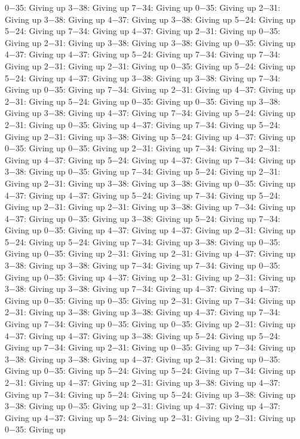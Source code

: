 0−35: Giving up
3−38: Giving up
7−34: Giving up
0−35: Giving up
2−31: Giving up
3−38: Giving up
4−37: Giving up
3−38: Giving up
5−24: Giving up
5−24: Giving up
7−34: Giving up
4−37: Giving up
2−31: Giving up
0−35: Giving up
2−31: Giving up
3−38: Giving up
3−38: Giving up
0−35: Giving up
4−37: Giving up
4−37: Giving up
5−24: Giving up
7−34: Giving up
7−34: Giving up
2−31: Giving up
2−31: Giving up
0−35: Giving up
5−24: Giving up
5−24: Giving up
4−37: Giving up
3−38: Giving up
3−38: Giving up
7−34: Giving up
0−35: Giving up
7−34: Giving up
2−31: Giving up
4−37: Giving up
2−31: Giving up
5−24: Giving up
0−35: Giving up
0−35: Giving up
3−38: Giving up
3−38: Giving up
4−37: Giving up
7−34: Giving up
5−24: Giving up
2−31: Giving up
0−35: Giving up
4−37: Giving up
7−34: Giving up
5−24: Giving up
2−31: Giving up
3−38: Giving up
5−24: Giving up
4−37: Giving up
0−35: Giving up
0−35: Giving up
2−31: Giving up
7−34: Giving up
2−31: Giving up
4−37: Giving up
5−24: Giving up
4−37: Giving up
7−34: Giving up
3−38: Giving up
0−35: Giving up
7−34: Giving up
5−24: Giving up
2−31: Giving up
2−31: Giving up
3−38: Giving up
3−38: Giving up
0−35: Giving up
4−37: Giving up
4−37: Giving up
5−24: Giving up
7−34: Giving up
5−24: Giving up
2−31: Giving up
2−31: Giving up
3−38: Giving up
7−34: Giving up
4−37: Giving up
0−35: Giving up
3−38: Giving up
5−24: Giving up
7−34: Giving up
0−35: Giving up
4−37: Giving up
4−37: Giving up
2−31: Giving up
5−24: Giving up
5−24: Giving up
7−34: Giving up
3−38: Giving up
0−35: Giving up
0−35: Giving up
2−31: Giving up
2−31: Giving up
4−37: Giving up
3−38: Giving up
3−38: Giving up
7−34: Giving up
7−34: Giving up
0−35: Giving up
0−35: Giving up
4−37: Giving up
2−31: Giving up
2−31: Giving up
3−38: Giving up
3−38: Giving up
7−34: Giving up
4−37: Giving up
4−37: Giving up
0−35: Giving up
0−35: Giving up
2−31: Giving up
7−34: Giving up
2−31: Giving up
3−38: Giving up
3−38: Giving up
4−37: Giving up
7−34: Giving up
7−34: Giving up
0−35: Giving up
0−35: Giving up
2−31: Giving up
4−37: Giving up
4−37: Giving up
3−38: Giving up
5−24: Giving up
5−24: Giving up
7−34: Giving up
2−31: Giving up
0−35: Giving up
7−34: Giving up
3−38: Giving up
3−38: Giving up
4−37: Giving up
2−31: Giving up
0−35: Giving up
0−35: Giving up
5−24: Giving up
5−24: Giving up
7−34: Giving up
2−31: Giving up
4−37: Giving up
2−31: Giving up
3−38: Giving up
4−37: Giving up
7−34: Giving up
5−24: Giving up
5−24: Giving up
3−38: Giving up
3−38: Giving up
0−35: Giving up
2−31: Giving up
4−37: Giving up
4−37: Giving up
4−37: Giving up
5−24: Giving up
2−31: Giving up
2−31: Giving up
0−35: Giving up
